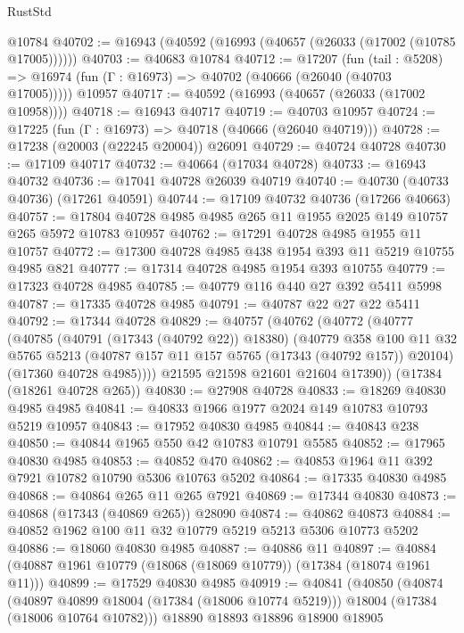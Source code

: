 \begin{lexlean}{RustStd}
\begin{coremodule}
    @10784
@40702 := @16943 (@40592 (@16993 (@40657 (@26033 (@17002 (@10785 @17005))))))
@40703 := @40683 @10784
@40712 := @17207
    (fun (tail : @5208) => @16974 (fun (Γ : @16973) => @40702 (@40666 (@26040 (@40703 @17005)))))
    @10957
@40717 := @40592 (@16993 (@40657 (@26033 (@17002 @10958))))
@40718 := @16943 @40717
@40719 := @40703 @10957
@40724 := @17225 (fun (Γ : @16973) => @40718 (@40666 (@26040 @40719)))
@40728 := @17238 (@20003 (@22245 @20004)) @26091
@40729 := @40724 @40728
@40730 := @17109 @40717
@40732 := @40664 (@17034 @40728)
@40733 := @16943 @40732
@40736 := @17041 @40728 @26039 @40719
@40740 := @40730 (@40733 @40736) (@17261 @40591)
@40744 := @17109 @40732 @40736 (@17266 @40663)
@40757 := @17804 @40728 @4985 @4985 @265 @11 @1955 @2025 @149 @10757 @265 @5972 @10783 @10957
@40762 := @17291 @40728 @4985 @1955 @11 @10757
@40772 := @17300 @40728 @4985 @438 @1954 @393 @11 @5219 @10755 @4985 @821
@40777 := @17314 @40728 @4985 @1954 @393 @10755
@40779 := @17323 @40728 @4985
@40785 := @40779 @116 @440 @27 @392 @5411 @5998
@40787 := @17335 @40728 @4985
@40791 := @40787 @22 @27 @22 @5411
@40792 := @17344 @40728
@40829 := @40757
    (@40762
      (@40772
        (@40777
          (@40785
            (@40791 (@17343 (@40792 @22)) @18380)
            (@40779
              @358
              @100
              @11
              @32
              @5765
              @5213
              (@40787 @157 @11 @157 @5765 (@17343 (@40792 @157)) @20104)
              (@17360 @40728 @4985))))
        @21595
        @21598
        @21601
        @21604
        @17390))
    (@17384 (@18261 @40728 @265))
@40830 := @27908 @40728
@40833 := @18269 @40830 @4985 @4985
@40841 := @40833 @1966 @1977 @2024 @149 @10783 @10793 @5219 @10957
@40843 := @17952 @40830 @4985
@40844 := @40843 @238
@40850 := @40844 @1965 @550 @42 @10783 @10791 @5585
@40852 := @17965 @40830 @4985
@40853 := @40852 @470
@40862 := @40853 @1964 @11 @392 @7921 @10782 @10790 @5306 @10763 @5202
@40864 := @17335 @40830 @4985
@40868 := @40864 @265 @11 @265 @7921
@40869 := @17344 @40830
@40873 := @40868 (@17343 (@40869 @265)) @28090
@40874 := @40862 @40873
@40884 := @40852 @1962 @100 @11 @32 @10779 @5219 @5213 @5306 @10773 @5202
@40886 := @18060 @40830 @4985
@40887 := @40886 @11
@40897 := @40884 (@40887 @1961 @10779 (@18068 (@18069 @10779)) (@17384 (@18074 @1961 @11)))
@40899 := @17529 @40830 @4985
@40919 := @40841
    (@40850
      (@40874
        (@40897 @40899 @18004 (@17384 (@18006 @10774 @5219)))
        @18004
        (@17384 (@18006 @10764 @10782)))
      @18890
      @18893
      @18896
      @18900
      @18905

\end{coremodule}
\end{lexlean}
